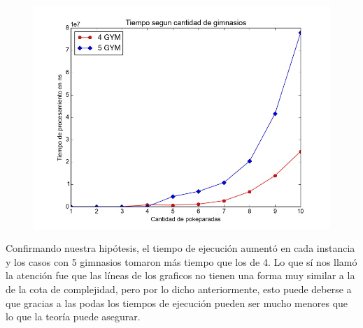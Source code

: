\begin{figure}[H]
    \begin{center}
      \includegraphics[width=0.7\columnwidth]{imagenes/exp4_ej1.jpeg}
      \caption{}
    \end{center}
\end{figure}

      Confirmando nuestra hipótesis, el tiempo de ejecución aumentó en cada instancia y los casos con 5 gimnasios tomaron más tiempo que los de 4. 
      Lo que sí nos llamó la atención fue que las líneas de los graficos no tienen una forma muy similar a la de la cota de complejidad, pero por lo dicho anteriormente, esto puede deberse a que gracias a las podas los tiempos de ejecución pueden ser mucho menores que lo que la teoría puede asegurar.
